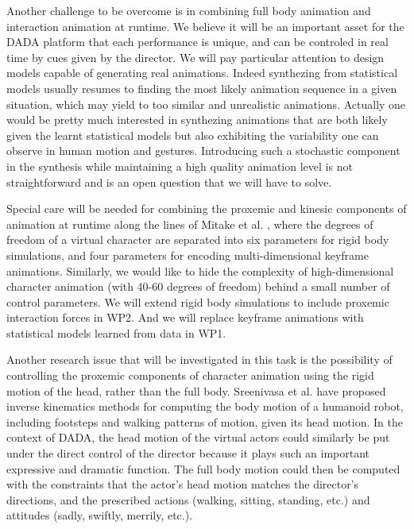 Another challenge to be overcome is in combining full body animation and interaction animation at runtime. We believe it will be an important asset for the DADA platform that each performance is unique, and can be controled in real time by cues given by the director.  We will pay particular attention to design models capable of generating real animations. Indeed synthezing from statistical models usually resumes to finding the most likely animation sequence in a given situation, which may yield to too similar and unrealistic animations.  Actually one would be pretty much interested in synthezing animations that are both likely given the learnt statistical models but also exhibiting the variability one can observe in human motion and gestures. Introducing such a stochastic component in the synthesis while maintaining a high quality animation level is not  straightforward and is an open question that we will have to solve.

Special care will be needed for combining the proxemic and kinesic components of animation at runtime along the lines of Mitake et al. \cite{Mitake09}, 
where the degrees of freedom of a virtual character are separated into six parameters for rigid body simulations,  and four parameters for encoding multi-dimensional keyframe animations. Similarly, we would like to hide the complexity of high-dimensional  character animation (with 40-60 degrees of freedom) behind a small number of control parameters. We will extend rigid body simulations  to include proxemic interaction forces in WP2. And we will replace keyframe animations with statistical models learned from data in WP1. 

Another research issue that will be investigated in this task  is the possibility  of  controlling the proxemic components of character animation using the rigid motion of the head, rather than the full body.  Sreenivasa et al. \cite{Sreenivasa09} have proposed inverse kinematics methods for computing  the body motion of a humanoid robot, including footsteps and walking patterns of motion, given its head motion. In the context of DADA, the head motion of the virtual actors could similarly be put under the direct control of the director because it plays such an important expressive and dramatic function. The full body motion could then be computed with the constraints that the actor's head motion matches the director's directions, and the prescribed actions (walking, sitting, standing, etc.) and attitudes (sadly, swiftly, merrily, etc.).


\vspace{1cm}

